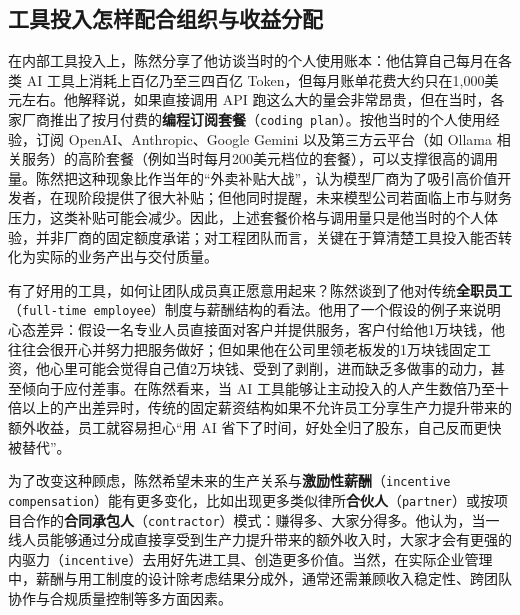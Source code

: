 \documentclass[UTF8,a4paper,11pt,fontset=fandol]{ctexart}
\begin{document}
\subsection{工具投入怎样配合组织与收益分配}
在内部工具投入上，陈然分享了他访谈当时的个人使用账本：他估算自己每月在各类 AI 工具上消耗上百亿乃至三四百亿 Token，但每月账单花费大约只在1,000美元左右。他解释说，如果直接调用 API 跑这么大的量会非常昂贵，但在当时，各家厂商推出了按月付费的\textbf{编程订阅套餐}（\texttt{coding plan}）。按他当时的个人使用经验，订阅 OpenAI、Anthropic、Google Gemini 以及第三方云平台（如 Ollama 相关服务）的高阶套餐（例如当时每月200美元档位的套餐），可以支撑很高的调用量。陈然把这种现象比作当年的“外卖补贴大战”，认为模型厂商为了吸引高价值开发者，在现阶段提供了很大补贴；但他同时提醒，未来模型公司若面临上市与财务压力，这类补贴可能会减少。因此，上述套餐价格与调用量只是他当时的个人体验，并非厂商的固定额度承诺；对工程团队而言，关键在于算清楚工具投入能否转化为实际的业务产出与交付质量。

有了好用的工具，如何让团队成员真正愿意用起来？陈然谈到了他对传统\textbf{全职员工}（\texttt{full-time employee}）制度与薪酬结构的看法。他用了一个假设的例子来说明心态差异：假设一名专业人员直接面对客户并提供服务，客户付给他1万块钱，他往往会很开心并努力把服务做好；但如果他在公司里领老板发的1万块钱固定工资，他心里可能会觉得自己值2万块钱、受到了剥削，进而缺乏多做事的动力，甚至倾向于应付差事。在陈然看来，当 AI 工具能够让主动投入的人产生数倍乃至十倍以上的产出差异时，传统的固定薪资结构如果不允许员工分享生产力提升带来的额外收益，员工就容易担心“用 AI 省下了时间，好处全归了股东，自己反而更快被替代”。

为了改变这种顾虑，陈然希望未来的生产关系与\textbf{激励性薪酬}（\texttt{incentive compensation}）能有更多变化，比如出现更多类似律所\textbf{合伙人}（\texttt{partner}）或按项目合作的\textbf{合同承包人}（\texttt{contractor}）模式：赚得多、大家分得多。他认为，当一线人员能够通过分成直接享受到生产力提升带来的额外收入时，大家才会有更强的内驱力（\texttt{incentive}）去用好先进工具、创造更多价值。当然，在实际企业管理中，薪酬与用工制度的设计除考虑结果分成外，通常还需兼顾收入稳定性、跨团队协作与合规质量控制等多方面因素。
\end{document}
